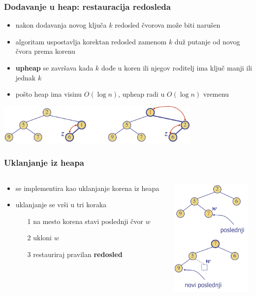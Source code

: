 \documentclass[compress,aspectratio=169]{beamer}
\begin{document}
\begin{frame}[fragile]
  \frametitle{Dodavanje u heap: restauracija redosleda}
  \begin{itemize}
    \item nakon dodavanja novog ključa $k$ redosled čvorova može biti narušen
    \item algoritam  uspostavlja korektan redosled zamenom $k$ duž
    putanje od novog čvora prema korenu
    \item \textbf{upheap} se završava kada $k$ dođe u koren ili njegov roditelj
    ima ključ manji ili jednak $k$
    \item pošto heap ima visinu $O(\log n)$, upheap radi u $O(\log n)$ vremenu
  \end{itemize}
  \begin{center}
    \includegraphics[width=10cm]{asp-09-pic07.png}
  \end{center}
\end{frame}

\begin{frame}[fragile]
  \frametitle{Uklanjanje iz heapa}
  \begin{columns}
    \begin{column}[c]{6cm}
      \begin{itemize}
        \item {} se implementira kao uklanjanje korena iz heapa
        \item uklanjanje se vrši u tri koraka
        \begin{itemize}
          \item[1] na mesto korena stavi poslednji čvor $w$
          \item[2] ukloni $w$
          \item[3] restauriraj pravilan \textbf{redosled}
        \end{itemize}
      \end{itemize}
    \end{column}
    \begin{column}[c]{5cm}
      \begin{center}
        \includegraphics[width=4cm]{asp-09-pic08.png}
      \end{center}
    \end{column}
  \end{columns}
\end{frame}
\end{document}
